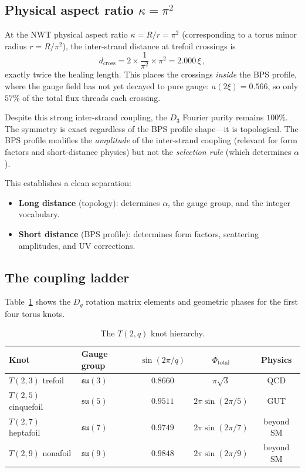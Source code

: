 \documentclass[11pt]{article}
\newcommand{\su}{\mathfrak{su}}
\begin{document}
\subsection{Physical aspect ratio $\kappa = \pi^2$}

At the NWT physical aspect ratio $\kappa = R/r = \pi^2$
(corresponding to a torus minor radius $r = R/\pi^2$), the
inter-strand distance at trefoil crossings is
\begin{equation}
  d_\text{cross} = 2 \times \frac{1}{\pi^2} \times \pi^2
  = 2.000\,\xi\,,
\end{equation}
exactly twice the healing length.  This places the crossings
\emph{inside} the BPS profile, where the gauge field has not yet
decayed to pure gauge: $a(2\xi) = 0.566$, so only $57\%$ of the
total flux threads each crossing.

Despite this strong inter-strand coupling, the $D_3$ Fourier
purity remains $100\%$.  The symmetry is exact regardless of the
BPS profile shape---it is topological.  The BPS profile modifies
the \emph{amplitude} of the inter-strand coupling (relevant for
form factors and short-distance physics) but not the
\emph{selection rule} (which determines $\alpha$).

This establishes a clean separation:
\begin{itemize}\setlength\itemsep{0pt}
  \item \textbf{Long distance} (topology): determines $\alpha$,
    the gauge group, and the integer vocabulary.
  \item \textbf{Short distance} (BPS profile): determines form
    factors, scattering amplitudes, and UV corrections.
\end{itemize}

\subsection{The coupling ladder}

Table~\ref{tab:hierarchy} shows the $D_q$ rotation matrix elements
and geometric phases for the first four torus knots.

\begin{table}[h]
\centering
\caption{The $T(2,q)$ knot hierarchy.}
\label{tab:hierarchy}
\begin{tabular}{llccc}
\toprule
Knot & Gauge group & $\sin(2\pi/q)$ & $\Phi_\text{total}$
& Physics \\
\midrule
$T(2,3)$ trefoil     & $\su(3)$ & $0.8660$ & $\pi\sqrt{3}$
  & QCD \\
$T(2,5)$ cinquefoil  & $\su(5)$ & $0.9511$ & $2\pi\sin(2\pi/5)$
  & GUT \\
$T(2,7)$ heptafoil   & $\su(7)$ & $0.9749$ & $2\pi\sin(2\pi/7)$
  & beyond SM \\
$T(2,9)$ nonafoil    & $\su(9)$ & $0.9848$ & $2\pi\sin(2\pi/9)$
  & beyond SM \\
\bottomrule
\end{tabular}
\end{table}
\end{document}
